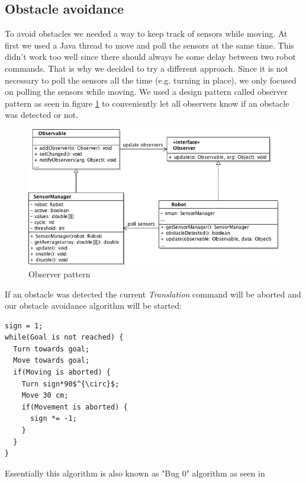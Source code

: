 \documentclass[703030]{iisreport}
\begin{document}
\subsection{Obstacle avoidance} \label{obstacle_avoidance}
To avoid obstacles we needed a way to keep track of sensors while moving. At
first we used a Java thread to move and poll the sensors at the same time. This
didn't work too well since there should always be some delay between two robot
commands. That is why we decided to try a different approach. Since it is not
necessary to poll the sensors all the time (e.g. turning in place), we only
focused on polling the sensors while moving. We used a design pattern called
observer pattern as seen in figure \ref{img:observerpattern} to conveniently let
all observers know if an obstacle was detected or not.

\begin{figure}
	\centering
	\includegraphics[width=\textwidth,height=\textheight,keepaspectratio]{observerpattern.png}
	\caption{Observer pattern}
	\label{img:observerpattern}
\end{figure}

\noindent If an obstacle was detected the current \emph{Translation} command 
will be aborted and our obstacle avoidance algorithm will be started:

\begin{lstlisting}[mathescape]
sign = 1;
while(Goal is not reached) {
  Turn towards goal;
  Move towards goal;
  if(Moving is aborted) {
    Turn sign*90$^{\circ}$;
    Move 30 cm;
    if(Movement is aborted) {
      sign *= -1;
    }
  }
}
\end{lstlisting}

\noindent Essentially this algorithm is also known as "Bug 0" algorithm as seen in \citep[7]{bug-algorithms}
\end{document}
